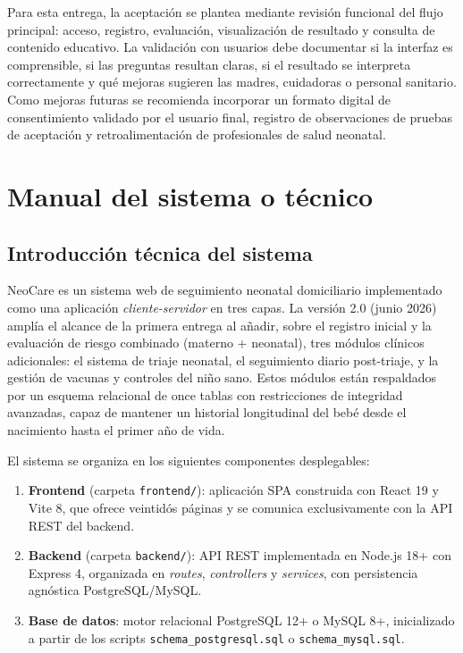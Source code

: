 \documentclass[12pt,letterpaper]{article}
\begin{document}
Para esta entrega, la aceptación se plantea mediante revisión funcional del flujo principal: acceso, registro, evaluación, visualización de resultado y consulta de contenido educativo. La validación con usuarios debe documentar si la interfaz es comprensible, si las preguntas resultan claras, si el resultado se interpreta correctamente y qué mejoras sugieren las madres, cuidadoras o personal sanitario. Como mejoras futuras se recomienda incorporar un formato digital de consentimiento validado por el usuario final, registro de observaciones de pruebas de aceptación y retroalimentación de profesionales de salud neonatal.

\section{Manual del sistema o técnico}

\subsection{Introducción técnica del sistema}

NeoCare es un sistema web de seguimiento neonatal domiciliario implementado como una aplicación \textit{cliente-servidor} en tres capas. La versión 2.0 (junio 2026) amplía el alcance de la primera entrega al añadir, sobre el registro inicial y la evaluación de riesgo combinado (materno + neonatal), tres módulos clínicos adicionales: el sistema de triaje neonatal, el seguimiento diario post-triaje, y la gestión de vacunas y controles del niño sano. Estos módulos están respaldados por un esquema relacional de once tablas con restricciones de integridad avanzadas, capaz de mantener un historial longitudinal del bebé desde el nacimiento hasta el primer año de vida.

El sistema se organiza en los siguientes componentes desplegables:

\begin{enumerate}
    \item \textbf{Frontend} (carpeta \texttt{frontend/}): aplicación SPA construida con React 19 y Vite 8, que ofrece veintidós páginas y se comunica exclusivamente con la API REST del backend.
    \item \textbf{Backend} (carpeta \texttt{backend/}): API REST implementada en Node.js 18+ con Express 4, organizada en \textit{routes}, \textit{controllers} y \textit{services}, con persistencia agnóstica PostgreSQL/MySQL.
    \item \textbf{Base de datos}: motor relacional PostgreSQL 12+ o MySQL 8+, inicializado a partir de los scripts \texttt{schema\_postgresql.sql} o \texttt{schema\_mysql.sql}.
\end{enumerate}
\end{document}
